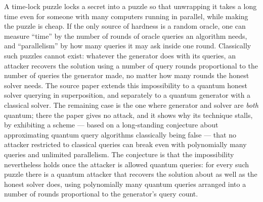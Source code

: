 \documentclass{aicr-conjecture}
\begin{document}

\vspace{0.4em}

\begin{informalconjecture}
A time-lock puzzle locks a secret into a puzzle so that unwrapping it takes
a long time even for someone with many computers running in parallel, while
making the puzzle is cheap. If the only source of hardness is a random
oracle, one can measure ``time'' by the number of rounds of oracle queries
an algorithm needs, and ``parallelism'' by how many queries it may ask
inside one round. Classically such puzzles cannot exist: whatever the
generator does with its queries, an attacker recovers the solution using a
number of query rounds proportional to the number of queries the generator
made, no matter how many rounds the honest solver needs. The source paper
extends this impossibility to a quantum honest solver querying in
superposition, and separately to a quantum generator with a classical
solver. The remaining case is the one where generator and solver are
\emph{both} quantum; there the paper gives no attack, and it shows why its
technique stalls, by exhibiting a scheme --- based on a long-standing
conjecture about approximating quantum query algorithms classically being
false --- that no attacker restricted to classical queries can break even
with polynomially many queries and unlimited parallelism. The conjecture is
that the impossibility nevertheless holds once the attacker is allowed
quantum queries: for every such puzzle there is a quantum attacker that
recovers the solution about as well as the honest solver does, using
polynomially many quantum queries arranged into a number of rounds
proportional to the generator's query count.
\end{informalconjecture}
\end{document}

